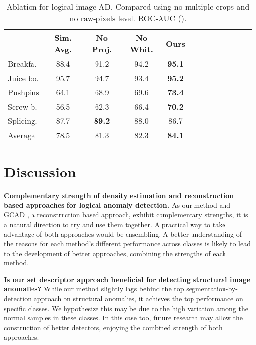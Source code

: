 \documentclass{article}
\begin{document}
\begin{table}
\caption{Ablation for logical image AD. Compared using no multiple crops and no  raw-pixels level. ROC-AUC  ().}
\centering
\small
\begin{tabular}{lcccccccccccc}
\toprule

	&	 Sim. Avg.	&	No Proj.	&	No Whit.	&	Ours	\\
  \toprule
Breakfa.	&	88.4	&	91.2	&	94.2	&	\textbf{95.1}	\\
Juice bo.	&	95.7	&	94.7	&	93.4	&	\textbf{95.2}	\\
Pushpins	&	64.1	&	68.9	&	69.6	&	\textbf{73.4}	\\
Screw b.	&	56.5	&	62.3	&	66.4	&	\textbf{70.2}	\\
Splicing.	&	87.7	&	\textbf{89.2}	&	88.0	&	86.7	\\
\midrule									
Average	&	78.5	&	81.3	&	82.3	&	\textbf{84.1}	\\



 
\bottomrule
\end{tabular}
\label{tab:abl_image_no_raw}
\end{table}

\section{Discussion} 
\label{sec:discussion}

\textbf{Complementary strength of density estimation and reconstruction based approaches for logical  anomaly detection.} As our method and GCAD \cite{bergmann2022beyond}, a reconstruction based approach, exhibit complementary strengths, it is a natural direction to try and use them together. A practical way to take advantage of both approaches would be ensembling. A better understanding of the reasons for each method's different performance across classes is likely to lead to the development of better approaches, combining the strengths of each method.

\textbf{Is our set descriptor approach beneficial for detecting structural image  anomalies?} While our method slightly lags behind the top segmentation-by-detection approach on structural anomalies, it achieves the top performance on specific classes. We hypothesize this may be due to the high variation among the normal samples in these classes. In this case too, future research may allow the construction of better detectors, enjoying the combined strength of both approaches.
\end{document}
